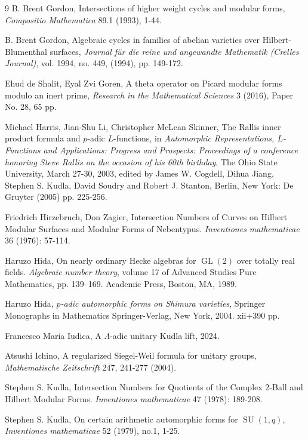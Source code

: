 \documentclass[12pt,a4paper,reqno]{amsart}
\theoremstyle{definition}
\numberwithin{definition}{subsection}
\theoremstyle{definition}
\numberwithin{Definition}{subsection}
\theoremstyle{remark}
\theoremstyle{remark}
\numberwithin{Remark}{subsection}
\theoremstyle{remark}
\theoremstyle{plain}
\numberwithin{Theorem}{subsection}
\theoremstyle{plain}
\theoremstyle{plain}
\theoremstyle{plain}
\theoremstyle{plain}
\theoremstyle{plain}
\theoremstyle{plain}
\theoremstyle{plain}
\DeclareMathOperator{\GL}{GL}
\DeclareMathOperator{\SU}{SU}
\begin{document}
\begin{thebibliography}{9}
B. Brent Gordon, Intersections of higher weight cycles and modular forms, \textit{Compositio Mathematica} 89.1 (1993), 1-44.

B. Brent Gordon, Algebraic cycles in families of abelian varieties over Hilbert-Blumenthal surfaces, \textit{Journal für die reine und angewandte Mathematik (Crelles Journal)}, vol. 1994, no. 449, (1994), pp. 149-172. 

Ehud de Shalit, Eyal Zvi Goren,
A theta operator on Picard modular forms modulo an inert prime, \textit{Research in the Mathematical Sciences} 3 (2016), Paper No. 28, 65 pp.

Michael Harris, Jian-Shu Li, Christopher McLean Skinner, The Rallis inner product formula and $p$-adic $L$-functions, in \emph{Automorphic Representations, $L$-Functions and Applications: Progress and Prospects: Proceedings of a conference honoring Steve Rallis on the occasion of his 60th birthday}, The Ohio State University, March 27-30, 2003, edited by James W. Cogdell, Dihua Jiang, Stephen S. Kudla, David Soudry and Robert J. Stanton, Berlin, New York: De Gruyter (2005) pp. 225-256.

Friedrich Hirzebruch, Don Zagier, Intersection Numbers of Curves on Hilbert Modular Surfaces and Modular Forms of Nebentypus. \textit{Inventiones mathematicae} 36 (1976): 57-114.

Haruzo Hida, On nearly ordinary Hecke algebras for $\GL(2)$ over totally real fields. \textit{Algebraic number
theory}, volume 17 of Advanced Studies Pure Mathematics, pp. 139–169. Academic Press, Boston, MA, 1989.

Haruzo Hida,
\emph{$p$-adic automorphic forms on Shimura varieties}, Springer Monographs in Mathematics
Springer-Verlag, New York, 2004. xii+390 pp.

Francesco Maria Iudica, A $\Lambda$-adic unitary Kudla lift, 2024.

Atsushi Ichino, A regularized Siegel-Weil formula for unitary groups, \textit{Mathematische Zeitschrift} 247, 241-277 (2004).

Stephen S. Kudla, Intersection Numbers for Quotients of the Complex 2-Ball and Hilbert Modular Forms. \textit{Inventiones mathematicae} 47 (1978): 189-208. 

Stephen S. Kudla, On certain arithmetic automorphic forms for $\SU(1,q)$, \textit{Inventiones mathematicae} 52 (1979), no.1, 1-25.


\end{thebibliography}
\end{document}
